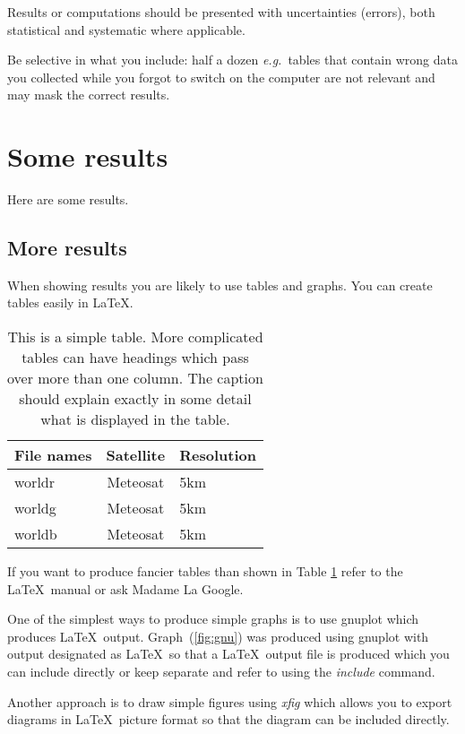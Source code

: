 \documentclass[12pt,a4paper]{report}
\begin{document}
Results or computations should be presented with uncertainties
(errors), both statistical and systematic where applicable.

Be selective in what you include: half a dozen \emph{e.g.}~tables that
contain wrong data you collected while you forgot to switch on the
computer are not relevant and may mask the correct results.


\section{Some results}
Here are some results.

\subsection{More results}
When showing results you are likely to use tables and graphs. You can
create tables easily in \LaTeX.

\begin{table}[h]
\begin{center}
\begin{tabular}{||l|c|l||}
\hline
\textbf{File names} & \textbf{Satellite} & \textbf{Resolution}\\
\hline
  worldr            &  Meteosat          &   5km\\
  worldg            &  Meteosat          &   5km\\
  worldb            &  Meteosat          &   5km\\
\hline
\end{tabular}
\end{center}
\caption{This is a simple table. More complicated tables can have
  headings which pass over more than one column. The caption should
  explain exactly in some detail what is displayed in the table.}
\label{simple_table}
\end{table}

If you want to produce fancier tables than shown in Table \ref{simple_table}
refer to the \LaTeX\ manual or ask Madame La Google.

One of the simplest ways to produce simple graphs is to use gnuplot
which produces \LaTeX\  output. Graph~(\ref{fig:gnu}) was produced using
gnuplot with output designated as \LaTeX\  so that a \LaTeX\  output file is
produced which you can include directly or keep separate and refer to
using the \emph{include} command.

Another approach is to draw simple figures using \emph{xfig} which allows
you to export diagrams in \LaTeX\  picture format so that the diagram can
be included directly.
\end{document}
